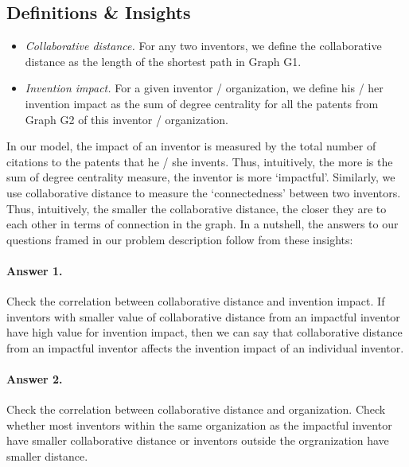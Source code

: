 \subsection{Definitions \& Insights}

	\begin{itemize}
	\squish
		\item {\em Collaborative distance.} For any two inventors, we define
		the collaborative distance as the length of the shortest path in
		Graph G1.
		\item {\em Invention impact.} For a given inventor / organization, we define his /
		her invention impact as the sum of degree centrality for
		all the patents from Graph G2 of this inventor / organization.
	\end{itemize}


In our model, the impact of an inventor is measured by the total number of citations
to the patents that he / she invents. Thus, intuitively, the more is the sum of degree
centrality measure, the inventor is more `impactful'. Similarly, we use
collaborative distance to measure the `connectedness' between two inventors.
Thus, intuitively, the smaller the collaborative distance, the closer they are
to each other in terms of connection in the graph.  In a nutshell, the answers
to our questions framed in our problem description follow from these insights:

\paragraph{Answer 1.} Check the correlation between collaborative distance and invention impact.
If inventors with smaller value of collaborative distance from an impactful inventor have 
high value for invention impact, then we can say that collaborative distance from an impactful inventor
affects the invention impact of an individual inventor.

\paragraph{Answer 2.} Check the correlation between collaborative distance and organization.
Check whether most inventors within the same organization as the impactful inventor
have smaller collaborative distance or inventors outside the orgranization have
smaller distance.

